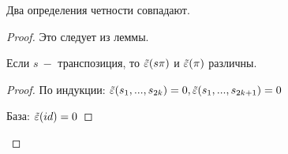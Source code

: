 \begin{theorem}
    Два определения четности совпадают.
\end{theorem}

\begin{proof}
    Это следует из леммы.

    \begin{lemma}
        Если $s\ -$ транспозиция, то $\Tilde{\varepsilon}(s\pi)$ и $\Tilde{\varepsilon}(\pi)$ различны.
    \end{lemma}

    \begin{proof}
        По индукции: $\Tilde{\varepsilon}(s_1,...,s_{2k})= 0, \Tilde{\varepsilon}(s_1,...,s_{2k+1})= 0$

        База: $\Tilde{\varepsilon}(id)=0$
    \end{proof}
\end{proof}